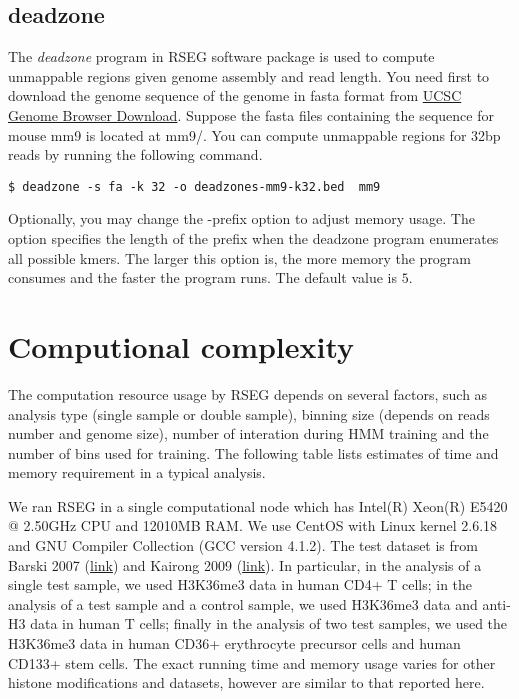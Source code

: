 \documentclass[11pt]{report}
\begin{document}
\subsection{deadzone}
\label{sec:deadzone}
The \textit{deadzone} program in RSEG software package is used to compute
unmappable regions given genome assembly and read length. You need first to
download the genome sequence of the genome in fasta format from
\href{http://hgdownload.cse.ucsc.edu/downloads.html}{UCSC Genome Browser
  Download}. Suppose the fasta files containing the sequence for mouse mm9 is
located at mm9/. You can compute unmappable regions for 32bp reads by running
the following command. 

\begin{verbatim}
$ deadzone -s fa -k 32 -o deadzones-mm9-k32.bed  mm9
\end{verbatim}

Optionally, you may change the -prefix option to adjust memory usage. The option
specifies the length of the prefix when the deadzone program enumerates all
possible kmers. The larger this option is, the more memory the program consumes
and the faster the program runs. The default value is $5$.

\section{Computional complexity}
\label{sec:comp-compl}
The computation resource usage by RSEG depends on several factors,
such as analysis type (single sample or double sample), binning size
(depends on reads number and genome size), number of interation during
HMM training and the number of bins used for training. The following
table lists estimates of time and memory requirement in a typical
analysis. 

We ran RSEG in a single computational node which has Intel(R) Xeon(R)
E5420 @ 2.50GHz CPU and 12010MB RAM. We use CentOS with Linux kernel
2.6.18 and GNU Compiler Collection (GCC version 4.1.2). The test
dataset is from Barski 2007
(\href{http://dir.nhlbi.nih.gov/papers/lmi/epigenomes/hgtcell.aspx}{link})
and Kairong 2009
(\href{http://dir.nhlbi.nih.gov/papers/lmi/epigenomes/hghscmethylation.aspx}{link}). In
particular, in the analysis of a single test sample, we used H3K36me3
data in human CD4+ T cells; in the analysis of a test sample and a
control sample, we used H3K36me3 data and anti-H3 data in human T
cells; finally in the analysis of two test samples, we used the
H3K36me3 data in human CD36+ erythrocyte precursor cells and human
CD133+ stem cells. The exact running time and memory usage varies for
other histone modifications and datasets, however are similar to that
reported here.
\end{document}
